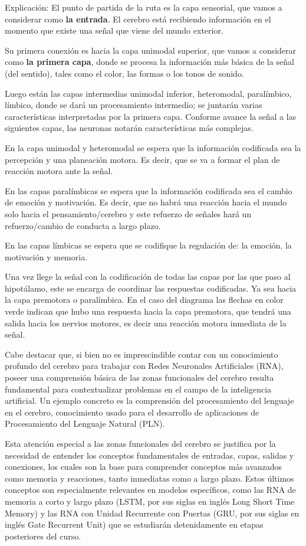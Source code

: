 Explicación: El punto de partida de la ruta es la capa sensorial, que vamos a considerar como \textbf{la entrada}. El cerebro está recibiendo información en el momento que existe una señal que viene del mundo exterior.

Su primera conexión es hacia la capa unimodal superior, que vamos a considerar como \textbf{la primera capa}, donde se procesa la información más básica de la señal (del sentido), tales como el color, las formas o los tonos de sonido.

Luego están las capas intermedias unimodal inferior, heteromodal, paralímbico, límbico, donde se dará un procesamiento intermedio; se juntarán varias características interpretadas por la primera capa. Conforme avance la señal a las siguientes capas, las neuronas notarán características más complejas. 

En la capa unimodal y heteromodal se espera que la información codificada sea la percepción y una planeación motora. Es decir, que se va a formar el plan de reacción motora ante la señal. 

En las capas paralímbicas se espera que la información codificada sea el cambio de emoción y motivación. Es decir, que no habrá una reacción hacia el mundo solo hacia el pensamiento/cerebro y este refuerzo de señales hará un refuerzo/cambio de conducta a largo plazo.

En las capas límbicas se espera que se codifique la regulación de: la emoción, la motivación y memoria.

Una vez llege la señal con la codificación de todas las capas por las que paso al hipotálamo, este se encarga de coordinar las respuestas codificadas. Ya sea hacia la capa premotora o paralímbica. En el caso del diagrama las flechas en color verde indican que hubo una respuesta hacia la capa premotora, que tendrá una salida hacia los nervios motores, es decir una reacción motora inmediata de la señal. 


Cabe destacar que, si bien no es imprescindible contar con un conocimiento profundo del cerebro para trabajar con Redes Neuronales Artificiales (RNA), poseer una comprensión básica de las zonas funcionales del cerebro resulta fundamental para contextualizar problemas en el campo de la inteligencia artificial. Un ejemplo concreto es la comprensión del procesamiento del lenguaje en el cerebro, conocimiento usado para el desarrollo de aplicaciones de Procesamiento del Lenguaje Natural (PLN).

Esta atención especial a las zonas funcionales del cerebro se justifica por la necesidad de entender los conceptos fundamentales de entradas, capas, salidas y conexiones, los cuales son la base para comprender conceptos más avanzados como memoria y reacciones, tanto inmediatas como a largo plazo. Estos últimos conceptos son especialmente relevantes en modelos específicos, como las RNA de memoria a corto y largo plazo (LSTM, por sus siglas en inglés Long Short Time Memory) y las RNA con Unidad Recurrente con Puertas (GRU, por sus siglas en inglés Gate Recurrent Unit)  que se estudiarán detenidamente en etapas posteriores del curso.







